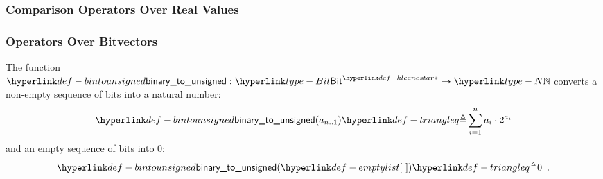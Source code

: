 \subsubsection{Comparison Operators Over Real Values \label{sec:ComparisonOverReal}}
\begin{mathpar}
\end{mathpar}

\begin{mathpar}
\end{mathpar}

\begin{mathpar}
\end{mathpar}

\begin{mathpar}
\end{mathpar}

\begin{mathpar}
\end{mathpar}

\begin{mathpar}
\end{mathpar}

\subsubsection{Operators Over Bitvectors \label{sec:BitvectorOperations}}
\hypertarget{def-bintounsigned}{}
The function $\bintounsigned : \KleeneStar{\Bit} \rightarrow \N$ converts a non-empty sequence of bits
into a natural number:
\[
  \bintounsigned(a_{n..1}) \triangleq \sum_{i=1}^n a_i \cdot 2^{a_i}
\]
and an empty sequence of bits into $0$:
\[
  \bintounsigned(\emptylist) \triangleq 0 \enspace.
\]

